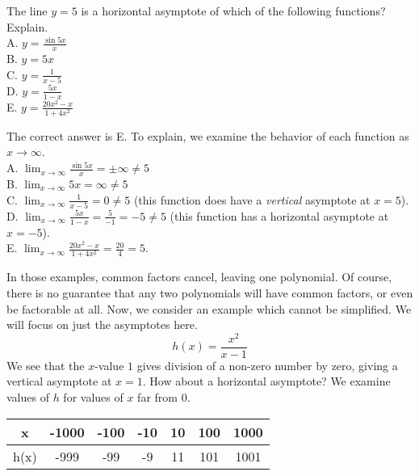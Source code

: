 \begin{Exercise} The line $y = 5$ is a horizontal 
	asymptote of which of the following functions? Explain. \\
	A. $y = \frac{\sin{5x}}{x}$\\
	B. $y = 5x$\\
	C. $y = \frac{1}{x-5}$\\
	D. $y = \frac{5x}{1-x}$\\
	E. $y = \frac{20x^2 - x}{1 + 4x^2}$
\end{Exercise}

\begin{Answer}[ref=ratfunc2]
	The correct answer is E. To explain, we examine the behavior of each 
	function as $x \to \infty$. \\
	A. $\lim_{x \to \infty} \frac{\sin{5x}}{x} = \pm \infty \neq 5$\\
	B. $\lim_{x \to \infty} 5x = \infty \neq 5$\\
	C. $\lim_{x \to \infty} \frac{1}{x-5} = 0 \neq 5$ (this function 
	does have a \textit{vertical} asymptote at $x = 5$). \\
	D. $\lim_{x \to \infty} \frac{5x}{1-x} = \frac{5}{-1} = -5 \neq 5$ 
	(this function has a horizontal asymptote at $x = -5$).\\
	E. $\lim_{x \to \infty} \frac{20x^2 - x}{1 + 4x^2} = \frac{20}{4} = 5$. 
\end{Answer}

In those examples, common factors cancel, leaving one polynomial. Of course, there is no guarantee that any two polynomials will have common factors, or even be factorable at all. Now, we consider an example which cannot be simplified. We will focus on just the asymptotes here.
\[ h(x) = \frac{x^2}{x - 1} \]
We see that the \( x \)-value \( 1 \) gives division of a non-zero number by zero, giving a vertical asymptote at \( x = 1 \). How about a horizontal asymptote? We examine values of \( h \) for values of \( x \) far from \( 0 \).

\begin{center}
\begin{tabular}{ |c|c|c|c|c|c|c| } 
 \hline
 x & -1000 & -100 & -10 & 10 & 100 & 1000 \\ 
 \hline
 h(x) & -999 & -99 & -9 & 11 & 101 & 1001 \\ 
 \hline
\end{tabular}
\end{center}

